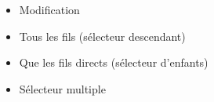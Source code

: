 \begin{itemize}
\tightlist
\item
  Modification
\end{itemize}

\begin{english}

\begin{Shaded}
\begin{Highlighting}[]
\FunctionTok{$}\NormalTok{(}\NormalTok{)}\NormalTok{(}\NormalTok{)}\OperatorTok{;} 
\end{Highlighting}
\end{Shaded}

\end{english}

\begin{itemize}
\tightlist
\item
  Tous les fils (sélecteur descendant)
\end{itemize}

\begin{english}

\begin{Shaded}
\begin{Highlighting}[]
\FunctionTok{$}\NormalTok{(}\NormalTok{)}\OperatorTok{;}
\end{Highlighting}
\end{Shaded}

\end{english}

\begin{itemize}
\tightlist
\item
  Que les fils directs (sélecteur d'enfants)
\end{itemize}

\begin{english}

\begin{Shaded}
\begin{Highlighting}[]
\FunctionTok{$}\NormalTok{(}\NormalTok{)}\OperatorTok{;}
\end{Highlighting}
\end{Shaded}

\end{english}

\begin{itemize}
\tightlist
\item
  Sélecteur multiple
\end{itemize}

